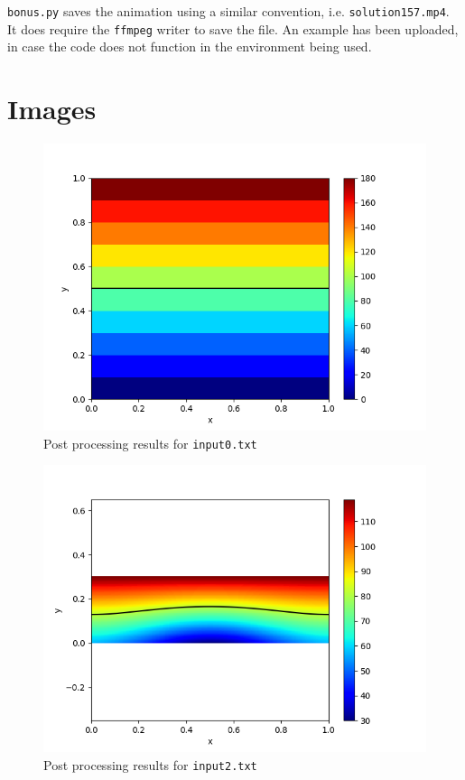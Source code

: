 \documentclass{article}
\begin{document}
\texttt{bonus.py} saves the animation using a similar convention, i.e. \texttt{solution157.mp4}.  It does require the \texttt{ffmpeg} writer to save the file.  An example has been uploaded, in case the code does not function in the environment being used.

\section{Images}

\begin{figure}[htb]
  \begin{center}
    \includegraphics[width=0.75\linewidth]{solution0009.png}
    \caption{Post processing results for \texttt{input0.txt}}
    \label{fig:input0}
  \end{center}
\end{figure}

\begin{figure}[H]
  \begin{center}
    \includegraphics[width=0.75\linewidth]{solution157.png}
    \caption{Post processing results for \texttt{input2.txt}}
    \label{fig:input2}
  \end{center}
\end{figure}

\nocite{*}


\end{document}
